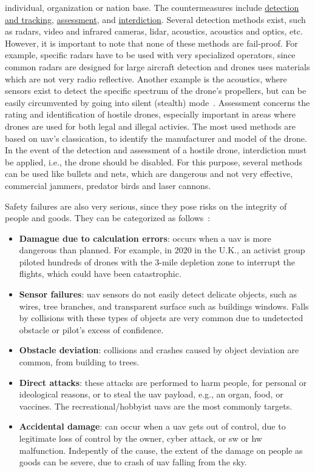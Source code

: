 \begin{itemize}
  individual, organization or nation base. The countermeasures include
  \underline{detection and tracking}, \underline{assessment}, and
  \underline{interdiction}. Several detection methods exist, such as radars,
  video and infrared cameras, \gls{lidar}, acoustics, acoustics and optics,
  etc. However, it is important to note that none of these methods are
  fail-proof. For example, specific radars have to be used with very specialized
  operators, since common radars are designed for large aircraft detection and
  drones uses materials which are not very radio reflective. Another example is
  the acoustics, where sensors exist to detect the specific spectrum of the
  drone's propellers, but can be easily circumvented by going into silent
  (stealth) mode~\cite{sathyamoorthy2015review}. Assessment concerns the rating
  and identification of hostile drones, especially important in areas where
  drones are used for both legal and illegal activies. The most used methods are
  based on \gls{uav}'s classication, to identify the manufacturer and model of
  the drone. In the event of the detection and assessment of a hostile drone,
  interdiction must be applied, i.e., the drone should be disabled. For this
  purpose, several methods can be used like bullets and nets, which are
  dangerous and not very effective, commercial jammers, predator birds and laser
  cannons.
\end{itemize}

Safety failures are also very serious, since they pose risks on the integrity of
people and goods. They can be categorized as follows~\cite{ferrao2020stuart}:
\begin{itemize}
\item \textbf{Damague due to calculation errors}: occurs when a \gls{uav} is
  more dangerous than planned. For example, in 2020 in the U.K., an activist
  group piloted hundreds of drones with the 3-mile depletion zone to interrupt
  the flights, which could have been catastrophic.
\item \textbf{Sensor failures}: \gls{uav} sensors do not easily detect delicate
  objects, such as wires, tree branches, and transparent surface such as
  buildings windows. Falls by collisions with these types of objects are very
  common due to undetected obstacle or pilot's excess of confidence.
\item \textbf{Obstacle deviation}: collisions and crashes caused by object
  deviation are common, from building to trees.
\item \textbf{Direct attacks}: these attacks are performed to harm people, for
  personal or ideological reasons, or to steal the \gls{uav} payload, e.g., an
  organ, food, or vaccines. The recreational/hobbyist \glspl{uav} are the most
  commonly targets.
\item \textbf{Accidental damage}: can occur when a \gls{uav} gets out of
  control, due to legitimate loss of control by the owner, cyber attack, or
  \gls{sw} or \gls{hw} malfunction. Indepently of the cause, the extent of the
  damage on people as goods can be severe, due to crash of \gls{uav} falling
  from the sky.
\end{itemize}


